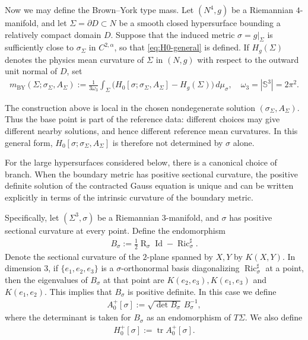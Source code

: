 \documentclass[10pt]{amsart}
\newcommand{\Sph}{\mathbb{S}}
\newcommand{\tr}{\operatorname{tr}}
\newcommand{\Ric}{\operatorname{Ric}}
\newcommand{\Id}{\operatorname{Id}}
\newcommand{\Scal}{\operatorname{R}}
\newcommand{\BY}{\mathrm{BY}}
\theoremstyle{plain}
\theoremstyle{remark}
\begin{document}
	Now we may define the Brown--York type mass. Let $(N^4,g)$ be a Riemannian
	$4$-manifold, and let $\Sigma=\partial D\subset N$ be a smooth closed hypersurface
	bounding a relatively compact domain $D$. Suppose that the induced metric
	$\sigma=g|_\Sigma$ is sufficiently close to $\sigma_\Sigma$ in $C^{2,\alpha}$, so
	that \eqref{eq:H0-general} is defined. If $H_g(\Sigma)$ denotes the physics mean curvature of $\Sigma$ in $(N,g)$ with respect to the outward unit normal of $D$, set
	\begin{align}
		m_{\BY}(\Sigma;\sigma_\Sigma,A_\Sigma)
		:=
		\frac{1}{3\omega_3}
		\int_{\Sigma}
		\bigl(
		H_0[\sigma;\sigma_\Sigma,A_\Sigma]
		-
		H_g(\Sigma)
		\bigr)\,d\mu_\sigma,
		\quad
		\omega_3=|\Sph^3|=2\pi^2 .
	\end{align}
	
	\medskip
	
	The construction above is local in the chosen nondegenerate solution
	$(\sigma_\Sigma,A_\Sigma)$. Thus the base point is part of the reference data:
	different choices may give different nearby solutions, and hence different
	reference mean curvatures. In this general form,
	$H_0[\sigma;\sigma_\Sigma,A_\Sigma]$ is therefore not determined by $\sigma$
	alone.
	
	For the large hypersurfaces considered below, there is a canonical choice of
	branch. When the boundary metric has positive sectional curvature, the positive
	definite solution of the contracted Gauss equation is unique and can be written
	explicitly in terms of the intrinsic curvature of the boundary metric.
	
	Specifically, let $(\Sigma^3,\sigma)$ be a Riemannian $3$-manifold, and $\sigma$ has positive sectional curvature at every point. Define the endomorphism
	\begin{align}\label{eq:B-sigma-def}
		B_\sigma
		:=
		\frac12\Scal_\sigma \Id
		-
		\Ric_\sigma^\sharp .
	\end{align}
	Denote the sectional curvature of the $2$-plane spanned by $X,Y$ by $K(X,Y)$. In dimension $3$, if
	$\{e_1,e_2,e_3\}$ is a $\sigma$-orthonormal basis diagonalizing
	$\Ric_\sigma^\sharp$ at a point, then the eigenvalues of $B_\sigma$ at that point are $K(e_2,e_3), K(e_1,e_3)$ and $K(e_1,e_2)$. This implies that $B_\sigma$ is positive definite. In this case we define
	\begin{align}\label{eq:A-plus-def}
		A_0^+[\sigma]
		:=
		\sqrt{\det B_\sigma}\,B_\sigma^{-1},
	\end{align}
	where the determinant is taken for $B_\sigma$ as an endomorphism of $T\Sigma$.
	We also define
	\begin{align}
		H_0^+[\sigma]
		:=
		\tr A_0^+[\sigma].
	\end{align}
	
\end{document}
